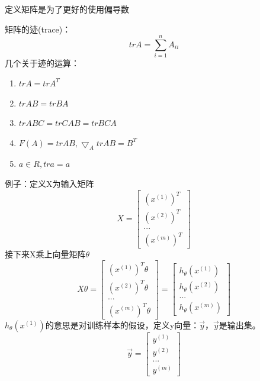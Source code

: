 \documentclass[a4paper,12pt]{ctexart}
\begin{document}
定义矩阵是为了更好的使用偏导数

矩阵的迹(trace)：
\begin{equation}\label{matix_trace}
tr A={\sum_{i=1}^{n}A_{ii}}
\end{equation}
几个关于迹的运算：
\begin{enumerate}
  \item $tr A = tr A^{T}$
  \item $tr AB = tr BA$
  \item $tr ABC = tr CAB = tr BCA$
  \item $F(A)=tr AB, \bigtriangledown_{A}tr AB = B^{T}$
  \item $a\in R, tr a = a$
\end{enumerate}

例子：定义X为输入矩阵
\begin{equation}
X={
    \left[
        \begin{array}{ccc}
            (x^{(1)})^{T}\\
            (x^{(2)})^{T}\\
            ...\\
            (x^{(m)})^{T}
        \end{array}
    \right ]
}
\end{equation}
接下来X乘上向量矩阵$\theta$
\begin{equation}
X\theta={
    \left[
        \begin{array}{ccc}
            (x^{(1)})^{T}\theta\\
            (x^{(2)})^{T}\theta\\
            ...\\
            (x^{(m)})^{T}\theta
        \end{array}
    \right ]
}={
    \left[
        \begin{array}{ccc}
            h_{\theta}(x^{(1)})\\
            h_{\theta}(x^{(2)})\\
            ...\\
            h_{\theta}(x^{(m)})
        \end{array}
    \right ]
}
\end{equation}
$h_{\theta}(x^{(1)})$的意思是对训练样本的假设，定义y向量：$\overrightarrow{y}$，$\overrightarrow{y}$是输出集。
\begin{equation}
\overrightarrow{y}={
    \left[
        \begin{array}{ccc}
            y^{(1)}\\
            y^{(2)}\\
            ...\\
            y^{(m)}
        \end{array}
    \right ]
}
\end{equation}
\end{document}
